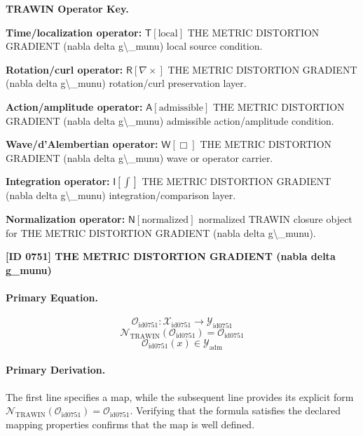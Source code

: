 \par\vspace{0.45\baselineskip}
\noindent\begin{minipage}[t]{\linewidth}
\begingroup
\small
\raggedright
\textbf{TRAWIN Operator Key.}\par
\noindent\textbf{Time/localization operator:} $\mathsf{T}\!\left[\mathrm{local}\right]$ THE METRIC DISTORTION GRADIENT (nabla delta g\textbackslash{}\_munu) local source condition.\par
\noindent\textbf{Rotation/curl operator:} $\mathsf{R}\!\left[\nabla\times\right]$ THE METRIC DISTORTION GRADIENT (nabla delta g\textbackslash{}\_munu) rotation/curl preservation layer.\par
\noindent\textbf{Action/amplitude operator:} $\mathsf{A}\!\left[\mathrm{admissible}\right]$ THE METRIC DISTORTION GRADIENT (nabla delta g\textbackslash{}\_munu) admissible action/amplitude condition.\par
\noindent\textbf{Wave/d'Alembertian operator:} $\mathsf{W}\!\left[\Box\right]$ THE METRIC DISTORTION GRADIENT (nabla delta g\textbackslash{}\_munu) wave or operator carrier.\par
\noindent\textbf{Integration operator:} $\mathsf{I}\!\left[\int\right]$ THE METRIC DISTORTION GRADIENT (nabla delta g\textbackslash{}\_munu) integration/comparison layer.\par
\noindent\textbf{Normalization operator:} $\mathsf{N}\!\left[\mathrm{normalized}\right]$ normalized TRAWIN closure object for THE METRIC DISTORTION GRADIENT (nabla delta g\textbackslash{}\_munu).\par
\endgroup
\end{minipage}

\clearpage
\noindent\textbf{[ID 0751] THE METRIC DISTORTION GRADIENT (nabla delta g\_munu)}\par
\vspace{0.35em}
\paragraph{Primary Equation.}
\[
\mathcal{O}_{\mathrm{id0751}}:\mathcal{X}_{\mathrm{id0751}}\longrightarrow\mathcal{Y}_{\mathrm{id0751}}
\]
\[
\mathcal{N}_{\mathrm{TRAWIN}}(\mathcal{O}_{\mathrm{id0751}})=\mathcal{O}_{\mathrm{id0751}}
\]
\[
\mathcal{O}_{\mathrm{id0751}}(x)\in\mathcal{Y}_{\mathrm{adm}}
\]

\paragraph{Primary Derivation.}
The first line specifies a map, while the subsequent line provides its explicit form \( \mathcal{N}_{\mathrm{TRAWIN}}(\mathcal{O}_{\mathrm{id0751}})=\mathcal{O}_{\mathrm{id0751}} \). Verifying that the formula satisfies the declared mapping properties confirms that the map is well defined.
